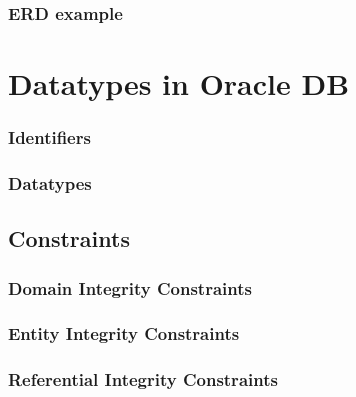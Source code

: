 \documentclass[14pt,fleqn]{extbook} %
\begin{document}
\subsection{ERD example}

%
%
%


\chapter{Datatypes in Oracle DB}
\subsection{Identifiers}

\subsection{Datatypes}

\section{Constraints}

\subsection{Domain Integrity Constraints}

\subsection{Entity Integrity Constraints}

\subsection{Referential Integrity Constraints}

\end{document}

